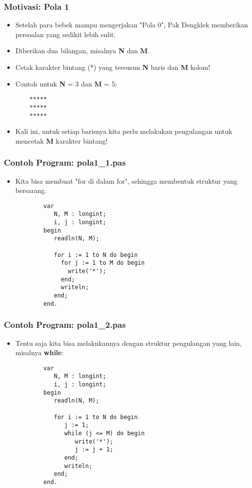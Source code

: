\documentclass{beamer}
\begin{document}
\begin{frame}[fragile]
\frametitle{Motivasi: Pola 1}
\begin{itemize}
    \item Setelah para bebek mampu mengerjakan "Pola 0", Pak Dengklek memberikan persoalan yang sedikit lebih sulit.
    \item Diberikan dua bilangan, misalnya \textbf{N} dan \textbf{M}.
    \item Cetak karakter bintang (*) yang tersusun \textbf{N} baris dan \textbf{M} kolom!

    \item Contoh untuk \textbf{N} = 3 dan \textbf{M} = 5:
    \begin{lstlisting}
    *****
    *****
    *****
    \end{lstlisting}

    \item Kali ini, untuk setiap barisnya kita perlu melakukan pengulangan untuk mencetak \textbf{M} karakter bintang!
\end{itemize}
\end{frame}

\begin{frame}[fragile]
\frametitle{Contoh Program: pola1\_1.pas}
\begin{itemize}
    \item Kita bisa membuat "for di dalam for", sehingga membentuk struktur yang bersarang.
    \begin{lstlisting}
        var
           N, M : longint;
           i, j : longint;
        begin
           readln(N, M);

           for i := 1 to N do begin
             for j := 1 to M do begin
               write('*');
             end;
             writeln;
           end;
        end.
    \end{lstlisting}
\end{itemize}
\end{frame}

\begin{frame}[fragile]
\frametitle{Contoh Program: pola1\_2.pas}
\begin{itemize}
    \item Tentu saja kita bisa melakukannya dengan struktur pengulangan yang lain, misalnya \textbf{while}:
    \begin{lstlisting}
        var
           N, M : longint;
           i, j : longint;
        begin
           readln(N, M);

           for i := 1 to N do begin
              j := 1;
              while (j <= M) do begin
                 write('*');
                 j := j + 1;
              end;
              writeln;
           end;
        end.
    \end{lstlisting}
\end{itemize}
\end{frame}
\end{document}
